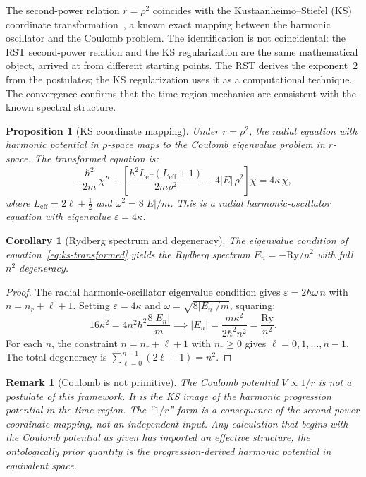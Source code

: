 \documentclass[11pt,a4paper]{article}
\newtheorem{proposition}[theorem]{Proposition}
\newtheorem{corollary}[theorem]{Corollary}
\newtheorem{remark}[theorem]{Remark}
\begin{document}
The second-power relation $r = \rho^2$ coincides with the Kustaanheimo--Stiefel (KS) coordinate transformation~\cite{KS1965}, a known exact mapping between the harmonic oscillator and the Coulomb problem. The identification is not coincidental: the RST second-power relation and the KS regularization are the same mathematical object, arrived at from different starting points. The RST derives the exponent~$2$ from the postulates; the KS regularization uses it as a computational technique. The convergence confirms that the time-region mechanics are consistent with the known spectral structure.

\begin{proposition}[KS coordinate mapping]
\label{prop:ks}
Under $r = \rho^2$, the radial equation with harmonic potential in $\rho$-space maps to the Coulomb eigenvalue problem in $r$-space. The transformed equation is:
\begin{equation}
\label{eq:ks-transformed}
-\frac{\hbar^2}{2m}\,\chi''
+ \left[\frac{\hbar^2 L_{\mathrm{eff}}(L_{\mathrm{eff}}+1)}{2m\rho^2} + 4|E|\,\rho^2\right]\chi
= 4\kappa\,\chi,
\end{equation}
where $L_{\mathrm{eff}} = 2\ell + \tfrac{1}{2}$ and $\omega^2 = 8|E|/m$. This is a radial harmonic-oscillator equation with eigenvalue $\varepsilon = 4\kappa$.
\end{proposition}

\begin{corollary}[Rydberg spectrum and degeneracy]
\label{cor:ks-spectrum}
The eigenvalue condition of equation~\eqref{eq:ks-transformed} yields the Rydberg spectrum $E_n = -\mathrm{Ry}/n^2$ with full $n^2$ degeneracy.
\end{corollary}

\begin{proof}
The radial harmonic-oscillator eigenvalue condition gives $\varepsilon = 2\hbar\omega\, n$ with $n = n_r + \ell + 1$. Setting $\varepsilon = 4\kappa$ and $\omega = \sqrt{8|E_n|/m}$, squaring:
\[
16\kappa^2 = 4n^2 \hbar^2 \frac{8|E_n|}{m} \implies |E_n| = \frac{m\kappa^2}{2\hbar^2 n^2} = \frac{\mathrm{Ry}}{n^2}.
\]
For each $n$, the constraint $n = n_r + \ell + 1$ with $n_r \geq 0$ gives $\ell = 0, 1, \ldots, n-1$. The total degeneracy is $\sum_{\ell=0}^{n-1}(2\ell+1) = n^2$.
\end{proof}

\begin{remark}[Coulomb is not primitive]
The Coulomb potential $V \propto 1/r$ is not a postulate of this framework. It is the KS image of the harmonic progression potential in the time region. The ``$1/r$'' form is a consequence of the second-power coordinate mapping, not an independent input. Any calculation that begins with the Coulomb potential as given has imported an effective structure; the ontologically prior quantity is the progression-derived harmonic potential in equivalent space.
\end{remark}
\end{document}
